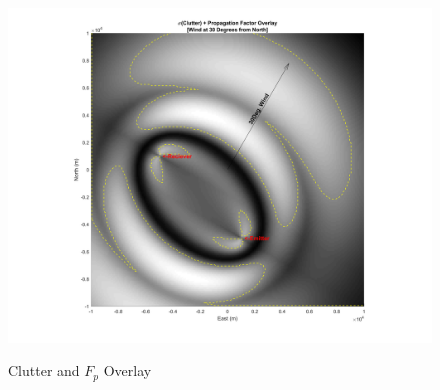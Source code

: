 \begin{figure}[H]
  \begin{center}
\includegraphics[width=5in]{../media/analysis/FpCCSOverlay.png}
  \end{center}
  \renewcommand{\baselinestretch}{1} \small\normalsize
  \begin{quote}
    \caption[Clutter and $F_p$ Overlay]{Clutter and $F_p$ Overlay\label{bc_fig:1}}
  \end{quote}
\end{figure}
\renewcommand{\baselinestretch}{2} \small\normalsize